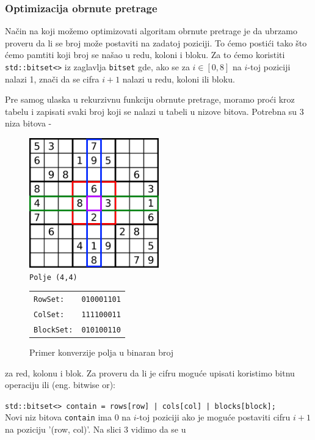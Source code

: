 \documentclass[a4paper]{article}
\begin{document}
    \subsubsection{Optimizacija obrnute pretrage}
    Način na koji možemo optimizovati algoritam obrnute pretrage je da ubrzamo proveru da li se broj može postaviti na zadatoj poziciji. To ćemo postići tako što ćemo pamtiti
    koji broj se našao u redu, koloni i bloku. Za to ćemo koristiti \texttt{std::bitset<>} iz zaglavlja \texttt{bitset} gde, ako se za $i \in [0,8]$ na $i$-toj poziciji nalazi 1, znači da se cifra $i+1$ nalazi u redu, koloni ili bloku.
    \par Pre samog ulaska u rekurzivnu funkciju obrnute pretrage, moramo proći kroz tabelu i zapisati svaki broj koji se nalazi u tabeli u nizove bitova. Potrebna su 3 niza bitova - 
    \begin{figure}[h]
        \centering
        \includegraphics[width=0.5\textwidth, height=0.5\textwidth]{img/conversion.png}\\
        \texttt{Polje (4,4)}\\
        \begin{tabular}{ l r }
            \texttt{RowSet: } & \texttt{010001101}\\
            \texttt{ColSet: } & \texttt{111100011}\\
            \texttt{BlockSet:}& \texttt{010100110}\\
        \end{tabular}
        \caption{Primer konverzije polja u binaran broj}
    \end{figure}
    za red, kolonu i blok. Za proveru da li je cifru moguće upisati
    koristimo bitnu operaciju ili (eng. bitwise or): 
    \par\texttt{std::bitset<> contain = rows[row] | cols[col] | blocks[block];}\\
    Novi niz bitova \texttt{contain} ima $0$ na $i$-toj poziciji ako je moguće postaviti cifru $i+1$ na poziciju '(row, col)'. Na slici 3 vidimo da se u 
\end{document}
